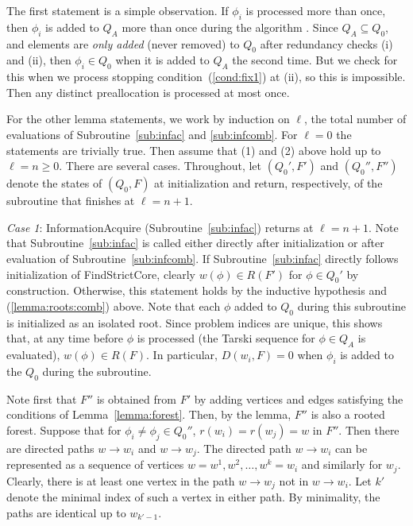 \documentclass[11pt,reqno]{amsart}
\theoremstyle{definition}
\numberwithin{equation}{section}
\newcommand{\pre}{\phi}
\newcommand{\sub}{\subseteq}
\newcommand{\acto}{Q_0}
\newcommand{\acta}{Q_A}
\newcommand{\forest}{F}
\newcommand{\roott}{R}
\newcommand{\depth}{D}
\newcommand{\infacredi}{(i)\xspace}
\newcommand{\infacredii}{(ii)\xspace}
\newcommand{\infacstoptwii}{(ii)\xspace}
\begin{document}
The first statement is a simple observation.
If $\pre_i$ is processed more than once, then $\pre_i$ is added to $\acta$ more than once during the algorithm . 
Since $\acta \sub \acto$, and elements are \emph{only added} (never removed) to $\acto$ after redundancy checks \infacredi and \infacredii, then $\pre_i \in \acto$ when it is added to $\acta$ the second time. 
But we check for this when we process stopping condition~(\ref{cond:fix1}) at \infacstoptwii, so this is impossible.  
Then any distinct preallocation is processed at most once. 

For the other lemma statements, we work by induction on $\ell$, the total number of evaluations of Subroutine~\ref{sub:infac} and \ref{sub:infcomb}. 
For $\ell = 0$ the statements are trivially true. 
Then assume that (1) and (2) above hold up to $\ell = n \geq 0$. 
There are several cases. 
Throughout, let $(\acto',\forest')$ and $(\acto'',\forest'')$ denote the states of $(\acto,\forest)$ at initialization and return, respectively, of the subroutine that finishes at $\ell = n + 1$.  

\emph{Case 1}: InformationAcquire (Subroutine~\ref{sub:infac}) returns at $\ell = n + 1$. 
Note that Subroutine~\ref{sub:infac} is called either directly after initialization or after evaluation of Subroutine~\ref{sub:infcomb}. 
If Subroutine~\ref{sub:infac} directly follows initialization of FindStrictCore, clearly $w(\pre) \in \roott(\forest')$ for $\pre \in \acto'$ by construction.
Otherwise, this statement holds by the inductive hypothesis and (\ref{lemma:roots:comb}) above. 
Note that each $\pre$ added to $\acto$ during this subroutine is initialized as an isolated root. 
Since problem indices are unique, this shows that, at any time before $\pre$ is processed (the Tarski sequence for $\pre \in \acta$ is evaluated), $w(\pre) \in \roott(\forest)$. 
In particular, $\depth(w_i, \forest) = 0$ when $\pre_i$ is added to the $\acto$ during the subroutine. 

Note first that $\forest''$ is obtained from $\forest'$ by adding vertices and edges satisfying the conditions of Lemma~\ref{lemma:forest}. 
Then, by the lemma, $\forest''$ is also a rooted forest.
Suppose that for $\pre_i \not = \pre_j \in \acto''$, $r(w_i) = r(w_j) = w$ in $\forest''$. 
Then there are directed paths $w \to w_i$ and $w \to w_j$. 
The directed path $w \to w_i$ can be represented as a sequence of vertices $w = w^1,w^2,\hdots, w^k = w_i$ and similarly for $w_j$. 
Clearly, there is at least one vertex in the path $w \to w_j$ not in $w \to w_i$. 
Let $k'$ denote the minimal index of such a vertex in either path. 
By minimality, the paths are identical up to $w_{k' - 1}$. 
\end{document}
